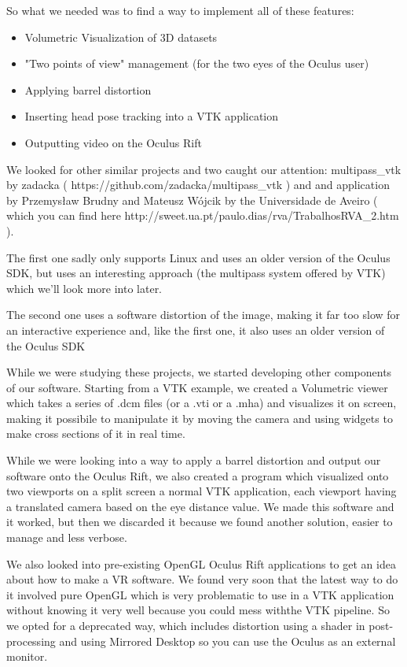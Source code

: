 \documentclass[11pt]{article} %
\begin{document}
So what we needed was to find a way to implement all of these features:
\begin{itemize}
\item Volumetric Visualization of 3D datasets
\item "Two points of view" management (for the two eyes of the Oculus user)
\item Applying barrel distortion
\item Inserting head pose tracking into a VTK application
\item Outputting video on the Oculus Rift
\end{itemize}

We looked for other similar projects and two caught our attention: multipass\_vtk by zadacka ( https://github.com/zadacka/multipass\_vtk ) and and application by  Przemysław Brudny and Mateusz Wójcik by the Universidade de Aveiro ( which you can find here http://sweet.ua.pt/paulo.dias/rva/TrabalhosRVA\_2.htm ).

The first one sadly only supports Linux and uses an older version of  the Oculus SDK, but uses an interesting approach (the multipass system offered by VTK) which we'll look more into later.

The second one uses a software distortion of the image, making it far too slow for an interactive experience and, like the first one, it also uses an older version of the Oculus SDK

While we were studying these projects, we started developing other components of our software.
Starting from a VTK example, we created a Volumetric viewer which takes a series of .dcm files (or a .vti or a .mha) and visualizes it on screen, making it possibile to manipulate it by moving the camera and using widgets to make cross sections of it in real time.

While we were looking into a way to apply a barrel distortion and output our software onto the Oculus Rift, we also created a program which visualized onto two viewports on a split screen a normal VTK application, each viewport having a translated camera based on the eye distance value. We made this software and it worked, but then we discarded it because we found another solution, easier to manage and less verbose.

We also looked into pre-existing OpenGL Oculus Rift applications to get an idea about how to make a VR software. We found very soon that the latest way to do it involved pure OpenGL which is very problematic to use in a VTK application without knowing it very well because you could mess withthe VTK pipeline. So we opted for a deprecated way, which includes distortion using a shader in post-processing and using Mirrored Desktop so you can use the Oculus as an external monitor.
\end{document}

